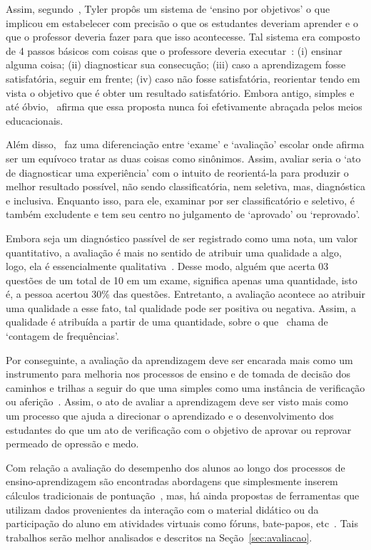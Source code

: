 Assim, segundo~\cite{luckesi:2014}, Tyler propôs um sistema de `ensino por objetivos' o que implicou em estabelecer com precisão o que os estudantes deveriam aprender e o que o professor deveria fazer para que isso acontecesse. Tal sistema era composto de 4 passos básicos com coisas que o professore deveria executar~\citep{luckesi:2014}: (i) ensinar alguma coisa; (ii) diagnosticar sua consecução; (iii) caso a aprendizagem fosse satisfatória, seguir em frente; (iv) caso não fosse satisfatória, reorientar tendo em vista o objetivo que é obter um resultado satisfatório. Embora antigo, simples e até óbvio,~\cite{luckesi:2014} afirma que essa proposta nunca foi efetivamente abraçada pelos meios educacionais.

Além disso,~\cite{luckesi:2002} faz uma diferenciação entre `exame' e `avaliação' escolar onde afirma ser um equívoco tratar as duas coisas como sinônimos. Assim, avaliar seria o `ato de diagnosticar uma experiência' com o intuito de reorientá-la para produzir o melhor resultado possível, não sendo classificatória, nem seletiva, mas, diagnóstica e inclusiva. Enquanto isso, para ele, examinar por ser classificatório e seletivo, é também excludente e tem seu centro no julgamento de `aprovado' ou `reprovado'.

Embora seja um diagnóstico passível de ser registrado como uma nota, um valor quantitativo, a avaliação é mais no sentido de atribuir uma qualidade a algo, logo, ela é essencialmente qualitativa~\citep{luckesi:2002}. Desse modo, alguém que acerta 03 questões de um total de 10 em um exame, significa apenas uma quantidade, isto é, a pessoa acertou 30\% das questões. Entretanto, a avaliação acontece ao atribuir uma qualidade a esse fato, tal qualidade pode ser positiva ou negativa. Assim, a qualidade é atribuída a partir de uma quantidade, sobre o que~\cite{luckesi:2002} chama de `contagem de frequências'.

Por conseguinte, a avaliação da aprendizagem deve ser encarada mais como um instrumento para melhoria nos processos de ensino e de tomada de decisão dos caminhos e trilhas a seguir do que uma simples como uma instância de verificação ou aferição~\cite{luckesi:2014}. Assim, o ato de avaliar a aprendizagem deve ser visto mais como um processo que ajuda a direcionar o aprendizado e o desenvolvimento dos estudantes do que um ato de verificação com o objetivo de aprovar ou reprovar permeado de opressão e medo.

Com relação a avaliação do desempenho dos alunos ao longo dos processos de ensino-aprendizagem são encontradas abordagens que simplesmente inserem cálculos tradicionais de pontuação~\citep{Orlandi:2012}, mas, há ainda propostas de ferramentas que utilizam dados provenientes da interação com o material didático ou da participação do aluno em atividades virtuais como fóruns, bate-papos, etc~\citep{Lucena:2015, Nunes:2016, Malvezzi:2010}. Tais trabalhos serão melhor analisados e descritos na Seção~\ref{sec:avaliacao}. 

